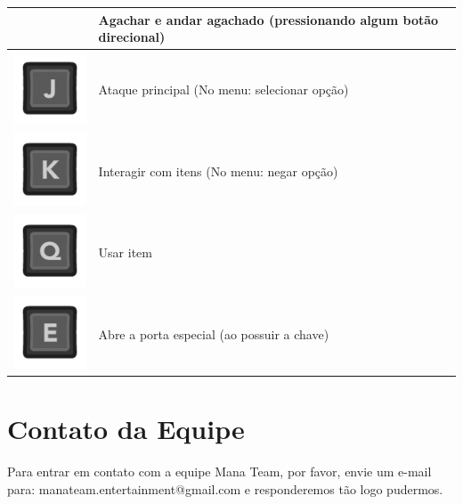 \documentclass[12pt]{article}
\begin{document}
\begin{longtable}{|c|p{10cm}|}
& Agachar e andar agachado (pressionando algum botão direcional)
\\
\hline
\includegraphics[scale=0.3]{images/kJ.png}
& Ataque principal (No menu: selecionar opção)
\\
\hline
\includegraphics[scale=0.3]{images/kK.png}
& Interagir com itens (No menu: negar opção)
\\
\hline
\includegraphics[scale=0.3]{images/kQ.png}
& Usar item 
\\
\hline
\includegraphics[scale=0.3]{images/kE.png}
& Abre a porta especial (ao possuir a chave) 
\\
\hline
\end{longtable}



\section{Contato da Equipe}
Para entrar em contato com a equipe Mana Team, por favor, envie um e-mail para: manateam.entertainment@gmail.com e responderemos tão logo pudermos.
\end{document}
